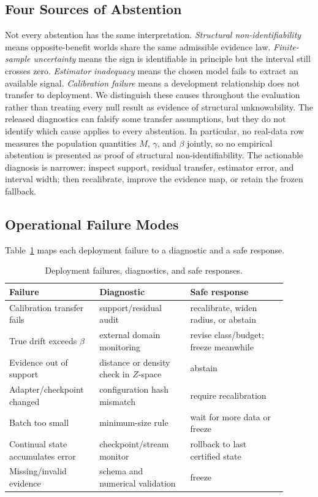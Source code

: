 \subsection{Four Sources of Abstention}
Not every abstention has the same interpretation. \emph{Structural non-identifiability} means opposite-benefit worlds share the same admissible evidence law. \emph{Finite-sample uncertainty} means the sign is identifiable in principle but the interval still crosses zero. \emph{Estimator inadequacy} means the chosen model fails to extract an available signal. \emph{Calibration failure} means a development relationship does not transfer to deployment. We distinguish these causes throughout the evaluation rather than treating every null result as evidence of structural unknowability.
The released diagnostics can falsify some transfer assumptions, but they do not identify which cause
applies to every abstention. In particular, no real-data row measures the population quantities
$M$, $\gamma$, and $\beta$ jointly, so no empirical abstention is presented as proof of structural
non-identifiability. The actionable diagnosis is narrower: inspect support, residual transfer,
estimator error, and interval width; then recalibrate, improve the evidence map, or retain the frozen
fallback.

\subsection{Operational Failure Modes}
Table~\ref{tab:failure-modes} maps each deployment failure to a diagnostic and a safe response.
\begin{table}[t]\centering\scriptsize
\caption{Deployment failures, diagnostics, and safe responses.}
\label{tab:failure-modes}
\begin{tabular}{@{}p{0.28\linewidth}p{0.30\linewidth}p{0.32\linewidth}@{}}
\toprule
Failure & Diagnostic & Safe response \\
\midrule
Calibration transfer fails & support/residual audit & recalibrate, widen radius, or abstain \\
True drift exceeds $\beta$ & external domain monitoring & revise class/budget; freeze meanwhile \\
Evidence out of support & distance or density check in $Z$-space & abstain \\
Adapter/checkpoint changed & configuration hash mismatch & require recalibration \\
Batch too small & minimum-size rule & wait for more data or freeze \\
Continual state accumulates error & checkpoint/stream monitor & rollback to last certified state \\
Missing/invalid evidence & schema and numerical validation & freeze \\
\bottomrule
\end{tabular}
\end{table}


